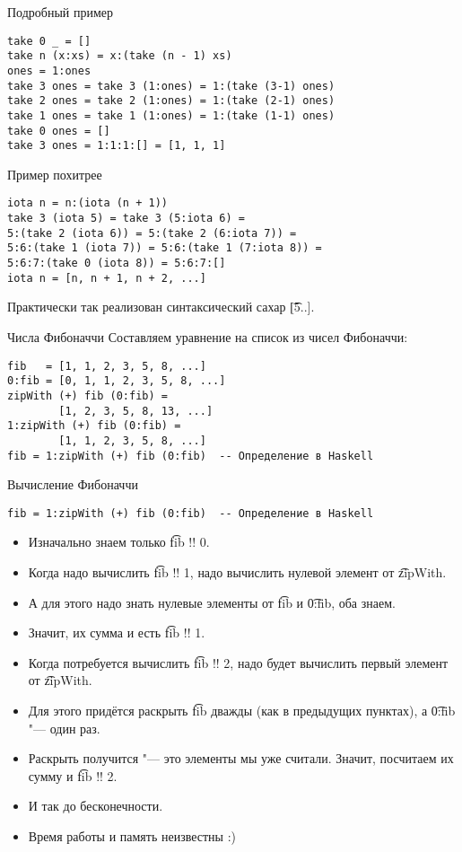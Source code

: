 \begin{frame}[fragile]{Подробный пример}
\begin{verbatim}
take 0 _ = []
take n (x:xs) = x:(take (n - 1) xs)
ones = 1:ones
take 3 ones = take 3 (1:ones) = 1:(take (3-1) ones)
take 2 ones = take 2 (1:ones) = 1:(take (2-1) ones)
take 1 ones = take 1 (1:ones) = 1:(take (1-1) ones)
take 0 ones = []
take 3 ones = 1:1:1:[] = [1, 1, 1]
\end{verbatim}
\end{frame}

\begin{frame}[fragile]{Пример похитрее}
\begin{verbatim}
iota n = n:(iota (n + 1))
take 3 (iota 5) = take 3 (5:iota 6) =
5:(take 2 (iota 6)) = 5:(take 2 (6:iota 7)) =
5:6:(take 1 (iota 7)) = 5:6:(take 1 (7:iota 8)) = 
5:6:7:(take 0 (iota 8)) = 5:6:7:[]
iota n = [n, n + 1, n + 2, ...]
\end{verbatim}
	Практически так реализован синтаксический сахар \t{[5..]}.
\end{frame}

\begin{frame}[fragile]{Числа Фибоначчи}
	Составляем уравнение на список из чисел Фибоначчи:
\begin{verbatim}
fib   = [1, 1, 2, 3, 5, 8, ...]
0:fib = [0, 1, 1, 2, 3, 5, 8, ...]
zipWith (+) fib (0:fib) = 
        [1, 2, 3, 5, 8, 13, ...]
1:zipWith (+) fib (0:fib) =
        [1, 1, 2, 3, 5, 8, ...]
fib = 1:zipWith (+) fib (0:fib)  -- Определение в Haskell
\end{verbatim}
\end{frame}

\begin{frame}[fragile]{Вычисление Фибоначчи}
\begin{verbatim}
fib = 1:zipWith (+) fib (0:fib)  -- Определение в Haskell
\end{verbatim}
	\begin{itemize}
		\item Изначально знаем только \t{fib !! 0}.
		\item Когда надо вычислить \t{fib !! 1}, надо вычислить нулевой элемент от \t{zipWith}.
		\item А для этого надо знать нулевые элементы от \t{fib} и \t{0:fib}, оба знаем.
		\item Значит, их сумма и есть \t{fib !! 1}.
		\item Когда потребуется вычислить \t{fib !! 2}, надо будет вычислить первый элемент от \t{zipWith}.
		\item Для этого придётся раскрыть \t{fib} дважды (как в предыдущих пунктах), а \t{0:fib} "--- один раз.
		\item Раскрыть получится "--- это элементы мы уже считали. Значит, посчитаем их сумму и \t{fib !! 2}.
		\item И так до бесконечности.
		\item Время работы и память неизвестны :)
	\end{itemize}
\end{frame}

